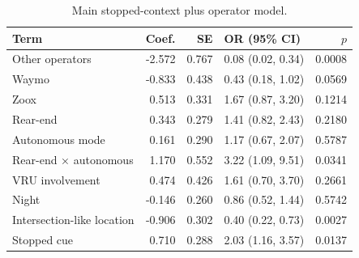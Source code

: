 \begin{table}[H]
\centering
\caption{Main stopped-context plus operator model.}
\label{tab:main_model}
\scriptsize
\renewcommand{\arraystretch}{1.08}
\begin{tabular}{p{3.5cm}rrp{4.3cm}r}
\toprule
Term & Coef. & SE & OR (95\% CI) & $p$ \\
\midrule
Other operators & -2.572 & 0.767 & 0.08 (0.02, 0.34) & 0.0008 \\
Waymo & -0.833 & 0.438 & 0.43 (0.18, 1.02) & 0.0569 \\
Zoox & 0.513 & 0.331 & 1.67 (0.87, 3.20) & 0.1214 \\
Rear-end & 0.343 & 0.279 & 1.41 (0.82, 2.43) & 0.2180 \\
Autonomous mode & 0.161 & 0.290 & 1.17 (0.67, 2.07) & 0.5787 \\
Rear-end × autonomous & 1.170 & 0.552 & 3.22 (1.09, 9.51) & 0.0341 \\
VRU involvement & 0.474 & 0.426 & 1.61 (0.70, 3.70) & 0.2661 \\
Night & -0.146 & 0.260 & 0.86 (0.52, 1.44) & 0.5742 \\
Intersection-like location & -0.906 & 0.302 & 0.40 (0.22, 0.73) & 0.0027 \\
Stopped cue & 0.710 & 0.288 & 2.03 (1.16, 3.57) & 0.0137 \\
\bottomrule
\end{tabular}
\end{table}
